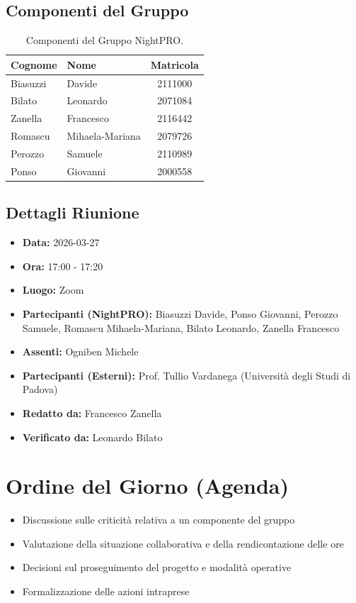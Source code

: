 \documentclass[a4paper, 11pt, oneside]{scrartcl} %
\begin{document}
\subsection{Componenti del Gruppo}
\begin{table}[h!]
\centering
\begin{tabular}{@{}llc@{}}
\toprule
\textbf{Cognome} & \textbf{Nome} & \textbf{Matricola} \\
\midrule
Biasuzzi & Davide & 2111000 \\
Bilato & Leonardo & 2071084 \\
Zanella & Francesco & 2116442 \\
Romascu & Mihaela-Mariana & 2079726 \\
Perozzo & Samuele & 2110989 \\
Ponso & Giovanni & 2000558 \\
\bottomrule
\end{tabular}
\caption{Componenti del Gruppo NightPRO.}
\end{table}

\subsection{Dettagli Riunione}
\begin{itemize}
    \item \textbf{Data:} 2026-03-27
    \item \textbf{Ora:} 17:00 - 17:20
    \item \textbf{Luogo:} Zoom
    \item \textbf{Partecipanti (NightPRO):} Biasuzzi Davide, Ponso Giovanni, Perozzo Samuele, Romascu Mihaela-Mariana, Bilato Leonardo, Zanella Francesco
    \item \textbf{Assenti:} Ogniben Michele
    \item \textbf{Partecipanti (Esterni):} Prof. Tullio Vardanega (Università degli Studi di Padova)
    \item \textbf{Redatto da: } Francesco Zanella
    \item \textbf{Verificato da:} Leonardo Bilato
\end{itemize}

\newpage
\section{Ordine del Giorno (Agenda)}
\begin{itemize}
    \item[1.] Discussione sulle criticità relativa a un componente del gruppo
    \item[2.] Valutazione della situazione collaborativa e della rendicontazione delle ore
    \item[3.] Decisioni sul proseguimento del progetto e modalità operative
    \item[4.] Formalizzazione delle azioni intraprese
\end{itemize}
\end{document}
